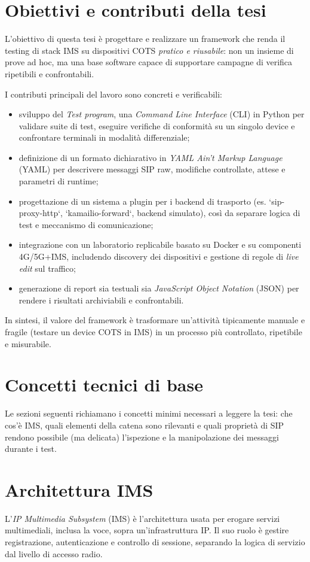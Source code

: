\section{Obiettivi e contributi della tesi}
L'obiettivo di questa tesi \`e progettare e realizzare un framework che renda il testing di stack IMS su dispositivi COTS \emph{pratico e riusabile}: non un insieme di prove ad hoc, ma una base software capace di supportare campagne di verifica ripetibili e confrontabili.

I contributi principali del lavoro sono concreti e verificabili:
\begin{itemize}
	\item sviluppo del \emph{Test program}, una \emph{Command Line Interface} (CLI) in Python per validare suite di test, eseguire verifiche di conformit\`a su un singolo device e confrontare terminali in modalit\`a differenziale;
	\item definizione di un formato dichiarativo in \emph{YAML Ain't Markup Language} (YAML) per descrivere messaggi SIP raw, modifiche controllate, attese e parametri di runtime;
	\item progettazione di un sistema a plugin per i backend di trasporto (es. `sip-proxy-http`, `kamailio-forward`, backend simulato), cos\`i da separare logica di test e meccanismo di comunicazione;
	\item integrazione con un laboratorio replicabile basato su Docker e su componenti 4G/5G+IMS, includendo discovery dei dispositivi e gestione di regole di \emph{live edit} sul traffico;
	\item generazione di report sia testuali sia \emph{JavaScript Object Notation} (JSON) per rendere i risultati archiviabili e confrontabili.
\end{itemize}

In sintesi, il valore del framework \`e trasformare un'attivit\`a tipicamente manuale e fragile (testare un device COTS in IMS) in un processo pi\`u controllato, ripetibile e misurabile.

\section{Concetti tecnici di base}
Le sezioni seguenti richiamano i concetti minimi necessari a leggere la tesi: che cos'\`e IMS, quali elementi della catena sono rilevanti e quali propriet\`a di SIP rendono possibile (ma delicata) l'ispezione e la manipolazione dei messaggi durante i test.

\section{Architettura IMS}
L'\emph{IP Multimedia Subsystem} (IMS) \`e l'architettura usata per erogare servizi multimediali, inclusa la voce, sopra un'infrastruttura IP. Il suo ruolo \`e gestire registrazione, autenticazione e controllo di sessione, separando la logica di servizio dal livello di accesso radio.

